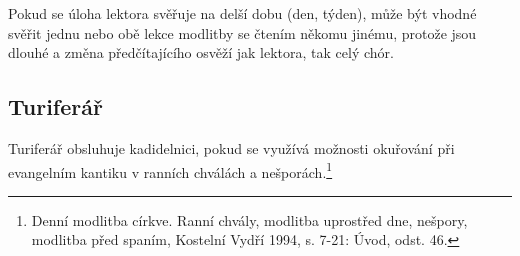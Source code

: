 Pokud se úloha lektora svěřuje na delší dobu (den, týden), může být vhodné
svěřit jednu nebo obě lekce modlitby se čtením někomu jinému, protože jsou
dlouhé a změna předčítajícího osvěží jak lektora, tak celý chór.

\subsection{Turiferář}

Turiferář obsluhuje kadidelnici, pokud se využívá možnosti okuřování
při evangelním kantiku v ranních chválách a nešporách.\footnote{Denní modlitba církve. Ranní chvály, modlitba uprostřed dne, nešpory, modlitba před spaním, Kostelní Vydří 1994, s. 7-21: Úvod, odst. 46.}
